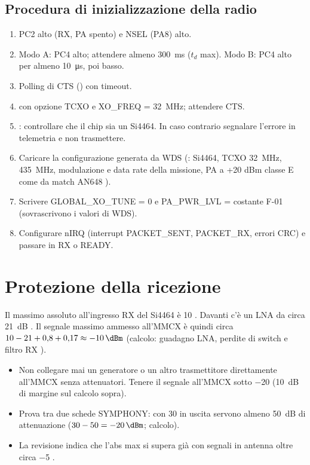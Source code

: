 \subsection{Procedura di inizializzazione della radio}
\begin{enumerate}
\item PC2 alto (RX, PA spento) e NSEL (PA8) alto.
\item Modo A: PC4 alto; attendere almeno \SI{300}{\milli\second} ($t_d$ max). Modo B: PC4 alto per almeno \SI{10}{\micro\second}, poi basso.
\item Polling di CTS () con timeout.
\item {} con opzione TCXO e XO\_FREQ = \SI{32}{\mega\hertz}; attendere CTS.
\item {}: controllare che il chip sia un Si4464. In caso contrario segnalare l'errore in telemetria e non trasmettere.
\item Caricare la configurazione generata da WDS (: Si4464, TCXO \SI{32}{\mega\hertz}, \SI{435}{\mega\hertz}, modulazione e data rate della missione, PA a +20 dBm classe E come da match AN648 ).
\item Scrivere GLOBAL\_XO\_TUNE = 0 e PA\_PWR\_LVL = costante F-01 (sovrascrivono i valori di WDS).
\item Configurare nIRQ (interrupt PACKET\_SENT, PACKET\_RX, errori CRC) e passare in RX o READY.
\end{enumerate}

\section{Protezione della ricezione}
\label{sec:rx-protezione}
Il massimo assoluto all'ingresso RX del Si4464 è \SI{+10}{\dBm} . Davanti c'è un LNA da circa \SI{21}{dB} . Il segnale massimo ammesso all'MMCX è quindi circa $10 - 21 + 0{,}8 + 0{,}17 \approx \SI{-10}{\dBm}$ (calcolo: guadagno LNA, perdite di switch e filtro RX ).

\begin{attenzione}[al banco]
\begin{itemize}
\item Non collegare mai un generatore o un altro trasmettitore direttamente all'MMCX senza attenuatori. Tenere il segnale all'MMCX sotto \SI{-20}{\dBm} (\SI{10}{dB} di margine sul calcolo sopra).
\item Prova tra due schede SYMPHONY: con \SI{30}{\dBm} in uscita servono almeno \SI{50}{dB} di attenuazione ($30 - 50 = \SI{-20}{\dBm}$; calcolo).
\item La revisione indica che l'abs max si supera già con segnali in antenna oltre circa \SI{-5}{\dBm} .
\end{itemize}
\end{attenzione}

